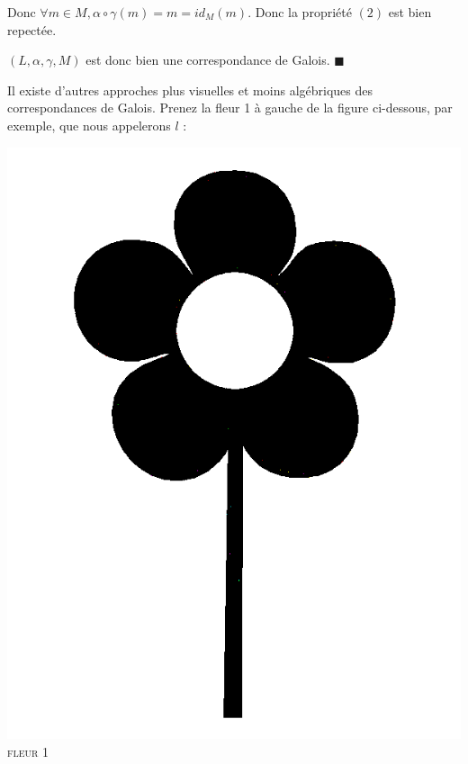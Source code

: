 \documentclass[french]{article}
\begin{document}
  Donc $\forall m \in M, \alpha \circ \gamma (m) = m = id_M(m)$. Donc la propriété $(2)$ est bien repectée.
  
  $(L, \alpha, \gamma, M)$ est donc bien une correspondance de Galois. \hfill $\blacksquare$
  
  \bigbreak
  
  Il existe d'autres approches plus visuelles et moins algébriques des correspondances de Galois. Prenez la fleur 1 à gauche de la figure ci-dessous, par exemple, que nous appelerons $l$ :
  
  
  \begin{center}
    \begin{minipage}{.3\textwidth}
      \begin{center}
	\includegraphics[scale=0.19]{./pictures/flower2.png}\\
	\textsc{fleur 1}
      \end{center}
    \end{minipage}

\end{center}
\end{document}
